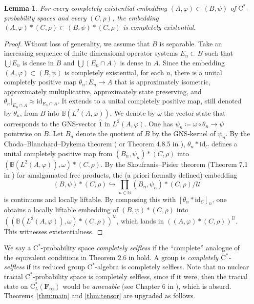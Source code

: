 \documentclass[12pt,nosumlimits,nonamelimits]{amsart}
\newtheorem{lem}[thm]{Lemma}
\theoremstyle{remark}
\theoremstyle{definition}
\newcommand{\IB}{\mathbb{B}}
\newcommand{\IN}{\mathbb{N}}
\newcommand{\bF}{\mathbf{F}}
\newcommand{\cU}{\mathcal{U}}
\newcommand{\vp}{\varphi}
\newcommand{\id}{\mathrm{id}}
\begin{document}
\begin{lem}
For every completely existential embedding $(A,\vp)\subset (B,\psi)$ of 
$\mathrm{C}^*$-prob\-a\-bility spaces and 
every $(C,\rho)$,  
the embedding $(A,\vp)\ast(C,\rho)\subset (B,\psi)\ast(C,\rho)$ 
is completely existential. 
\end{lem}
\begin{proof}
Wthout loss of generality, we assume that $B$ is separable. 
Take an increasing sequence of finite dimensional operator 
systems $E_n\subset B$ such that $\bigcup E_n$ is dense in $B$ 
and $\bigcup (E_n\cap A)$ is dense in $A$. 
Since the embedding $(A,\vp)\subset(B,\psi)$ 
is completely existential, for each $n$, there is a unital completely positive map $\theta_n\colon E_n\to A$ 
that is approximately isometric, approximately multiplicative, 
approximately state preserving, and $\theta_n|_{E_n\cap A}\approx\id_{E_n\cap A}$.
It extends to a unital completely positive 
map, still denoted by $\theta_n$, 
from $B$ into $\IB(L^2(A,\vp))$. 
We denote by $\omega$ the vector state that corresponds to the 
GNS-vector $\hat{1}$ in $L^2(A,\vp)$. 
One has $\psi_n \coloneq \omega\circ\theta_n\to\psi$ pointwise on $B$. 
Let $B_n$ denote the quotient of $B$ by the GNS-kernel of $\psi_n$. 
By the Choda--Blanchard--Dykema theorem (\cite{bd} 
or Theorem 4.8.5 in \cite{bo}), $\theta_n\ast\id_C$ 
defines a unital completely positive map from 
$(B_n,\psi_n)\ast(C,\rho)$ into $(\IB(L^2(A,\vp)),\omega)\ast(C,\rho)$. 
By the Skoufranis--Pisier theorem 
(Theorem 7.1 in \cite{pisier}) for amalgamated free products, 
the (a priori formally defined) embedding 
\[
(B,\psi)\ast (C,\rho) \hookrightarrow \prod_{n\in \IN}(B_n,\psi_n)\ast(C,\rho)/\cU
\]
is continuous and locally liftable. 
By composing this with $[\theta_n\ast\id_C]_n$, 
one obtains a locally liftable embedding 
of $(B,\psi)\ast (C,\rho)$ into $((\IB(L^2(A,\vp)),\omega)\ast(C,\rho))^\cU$, 
which lands in $((A,\vp)\ast(C,\rho))^\cU$. 
This witnesses existentialness. 
\end{proof}

We say a $\mathrm{C}^*$-prob\-a\-bility space 
\emph{completely selfless} if the ``complete'' analogue of 
the equivalent conditions 
in Theorem 2.6 in \cite{robert} hold. 
A group is \emph{completely $\mathrm{C}^*$-selfless} if its 
reduced group $\mathrm{C}^*$-alge\-bra is completely selfless.
Note that no nuclear tracial $\mathrm{C}^*$-prob\-a\-bility 
space is completely selfless, 
since if it were, then the tracial 
state on $\mathrm{C}^*_\lambda(\bF_\infty)$ 
would be \emph{amenable} (see Chapter 6 in \cite{bo}), 
which is absurd. 
Theorems~\ref{thm:main} and \ref{thm:tensor} 
are upgraded as follows. 
\end{document}
